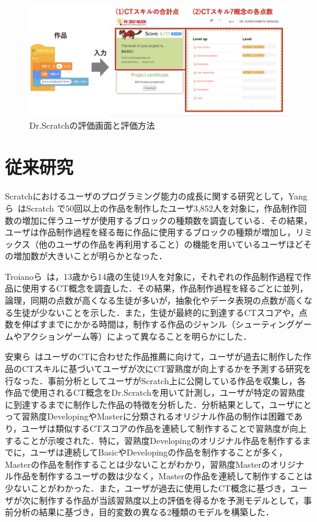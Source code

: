 \documentclass[11pt,dvipdfmx]{jreport}
\begin{document}
\begin{figure}[t]
	\centering
	\includegraphics[width=1.0\linewidth]{Okamoto_fig/drscratch.pdf}
	\caption{Dr.Scratchの評価画面と評価方法}
	\label{fig:drscratch}
\end{figure}

\section{従来研究}
Scratchにおけるユーザのプログラミング能力の成長に関する研究として，Yangら~\cite{Yang_2015}はScratch
で50回以上の作品を制作したユーザ3,852人を対象に，作品制作回数の増加に伴うユーザが使用するブロックの種類数を調査している．その結果，ユーザは作品制作過程を経る毎に作品に使用するブロックの種類が増加し，リミックス（他のユーザの作品を再利用すること）の機能を用いているユーザほどその増加数が大きいことが明らかとなった．

Troianoら~\cite{Troiano_2019}は，13歳から14歳の生徒19人を対象に，それぞれの作品制作過程で作品に使用するCT概念を調査した．その結果，作品制作過程を経るごとに並列，論理，同期の点数が高くなる生徒が多いが，抽象化やデータ表現の点数が高くなる生徒が少ないことを示した．また，生徒が最終的に到達するCTスコアや，点数を伸ばすまでにかかる時間は，制作する作品のジャンル（シューティングゲームやアクションゲーム等）によって異なることを明らかにした．

安東ら~\cite{Ando_2021}はユーザのCTに合わせた作品推薦に向けて，ユーザが過去に制作した作品のCTスキルに基づいてユーザが次にCT習熟度が向上するかを予測する研究を行なった．事前分析としてユーザがScratch上に公開している作品を収集し，各作品で使用されるCT概念をDr.Scratchを用いて計測し，ユーザが特定の習熟度に到達するまでに制作した作品の特徴を分析した．分析結果として，ユーザにとって習熟度DevelopingやMasterに分類されるオリジナル作品の制作は困難であり，ユーザは類似するCTスコアの作品を連続して制作することで習熟度が向上することが示唆された．特に，習熟度Developingのオリジナル作品を制作するまでに，ユーザは連続してBasicやDevelopingの作品を制作することが多く，Masterの作品を制作することは少ないことがわかり，習熟度Masterのオリジナル作品を制作するユーザの数は少なく，Masterの作品を連続して制作することは少ないことがわかった．また，ユーザが過去に使用したCT概念に基づき，ユーザが次に制作する作品が当該習熟度以上の評価を得るかを予測モデルとして，事前分析の結果に基づき，目的変数の異なる2種類のモデルを構築した．
\end{document}
